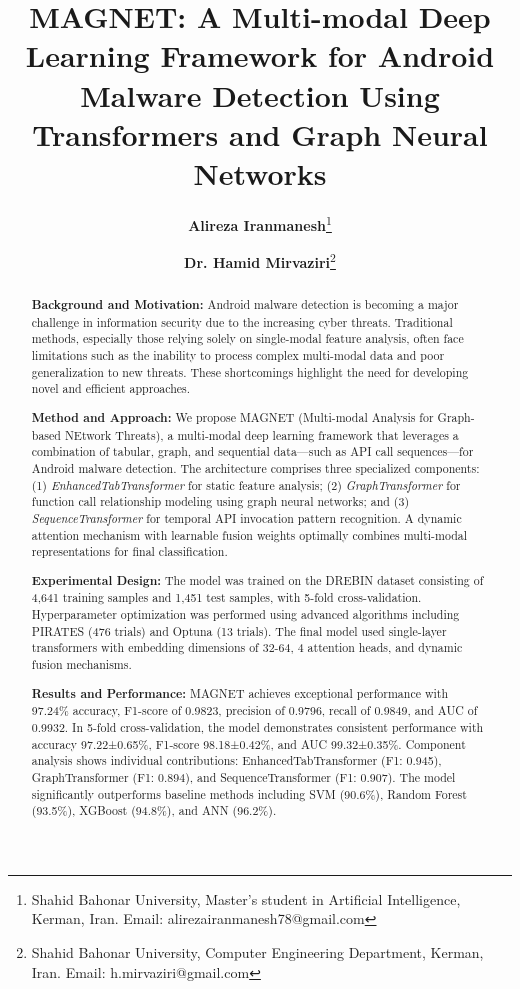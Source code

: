 \documentclass[a4paper,11pt]{article}
\begin{document}
\title{\Large\textbf{MAGNET: A Multi-modal Deep Learning Framework for Android Malware Detection Using Transformers and Graph Neural Networks}}
\author{
  \textbf{Alireza Iranmanesh}\thanks{Shahid Bahonar University, Master's student in Artificial Intelligence, Kerman, Iran. Email: alirezairanmanesh78@gmail.com} \and
  \textbf{Dr. Hamid Mirvaziri}\thanks{Shahid Bahonar University, Computer Engineering Department, Kerman, Iran. Email: h.mirvaziri@gmail.com}
}
\maketitle
\vspace{-1em}

\begin{abstract}

\textbf{Background and Motivation:} Android malware detection is becoming a major challenge in information security due to the increasing cyber threats. Traditional methods, especially those relying solely on single-modal feature analysis, often face limitations such as the inability to process complex multi-modal data and poor generalization to new threats. These shortcomings highlight the need for developing novel and efficient approaches.

\textbf{Method and Approach:} We propose MAGNET (Multi-modal Analysis for Graph-based NEtwork Threats), a multi-modal deep learning framework that leverages a combination of tabular, graph, and sequential data—such as API call sequences—for Android malware detection. The architecture comprises three specialized components: (1) \textit{EnhancedTabTransformer} for static feature analysis; (2) \textit{GraphTransformer} for function call relationship modeling using graph neural networks; and (3) \textit{SequenceTransformer} for temporal API invocation pattern recognition. A dynamic attention mechanism with learnable fusion weights optimally combines multi-modal representations for final classification.

\textbf{Experimental Design:} The model was trained on the DREBIN dataset consisting of 4,641 training samples and 1,451 test samples, with 5-fold cross-validation. Hyperparameter optimization was performed using advanced algorithms including PIRATES (476 trials) and Optuna (13 trials). The final model used single-layer transformers with embedding dimensions of 32-64, 4 attention heads, and dynamic fusion mechanisms.

\textbf{Results and Performance:} MAGNET achieves exceptional performance with 97.24\% accuracy, F1-score of 0.9823, precision of 0.9796, recall of 0.9849, and AUC of 0.9932. In 5-fold cross-validation, the model demonstrates consistent performance with accuracy 97.22±0.65\%, F1-score 98.18±0.42\%, and AUC 99.32±0.35\%. Component analysis shows individual contributions: EnhancedTabTransformer (F1: 0.945), GraphTransformer (F1: 0.894), and SequenceTransformer (F1: 0.907). The model significantly outperforms baseline methods including SVM (90.6\%), Random Forest (93.5\%), XGBoost (94.8\%), and ANN (96.2\%).


\end{abstract}
\end{document}
